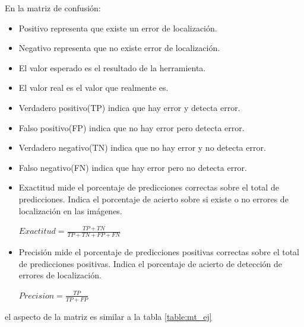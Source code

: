 En la matriz de confusión: 
\begin{itemize}
	\item Positivo representa que existe un error de localización.
	\item Negativo representa que no existe error de localización.
	\item El valor esperado es el resultado de la herramienta.
	\item El valor real es el valor que realmente es.
	\item Verdadero positivo(TP) indica que hay error y detecta error.
	\item Falso positivo(FP) indica que no hay error pero detecta error. 
	\item Verdadero negativo(TN) indica que no hay error y no detecta error.
	\item Falso negativo(FN) indica que hay error pero no detecta error. 
	\item Exactitud mide el porcentaje de predicciones correctas sobre el total de predicciones. Indica el porcentaje de acierto sobre si existe o no errores de localización en las imágenes.
	
	$Exactitud = \frac{TP + TN}{TP + TN + FP + FN}$
	
	\item Precisión mide el porcentaje de predicciones positivas correctas sobre el total de predicciones positivas. Indica el porcentaje de acierto de detección de errores de localización.
	
	$Precision = \frac{TP}{TP + FP}$
\end{itemize}
el aspecto de la matriz es similar a la tabla \ref{table:mt_ej}

